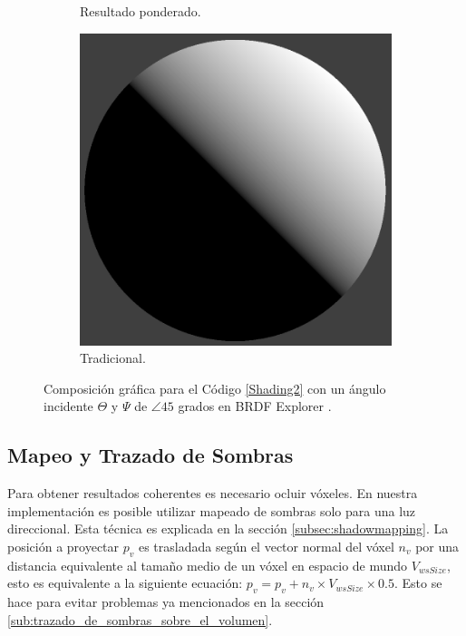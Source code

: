 \begin{figure}[H]
\begin{subfigure}[t]{0.2\textwidth}
		\caption*{Resultado ponderado.}
	\end{subfigure}%
	\begin{subfigure}[t]{0.2\textwidth}
		\centering
		\captionsetup{justification=centering}
		\includegraphics[width=\linewidth]{media/nDotLT.png}
		\caption*{Tradicional.}
	\end{subfigure}%
	\caption{Composición gráfica para el Código \ref{Shading2} con un ángulo incidente $\Theta$ y $\Psi$ de $\angle 45$ grados en BRDF Explorer \cite{brdf_explorer}.}
	\label{fig:compositve_vshading}
\end{figure}

\subsection{Mapeo y Trazado de Sombras}

Para obtener resultados coherentes es necesario ocluir vóxeles. En nuestra implementación es posible utilizar mapeado de sombras solo para una luz direccional. Esta técnica es explicada en la sección \ref{subsec:shadowmapping}. La posición a proyectar $p_{v}$ es trasladada según el vector normal del vóxel $n_{v}$ por una distancia equivalente al tamaño medio de un vóxel en espacio de mundo $V_{wsSize}$, esto es equivalente a la siguiente ecuación: $p_{v} = p_{v} + n_{v}\times V_{wsSize}\times 0.5$. Esto se hace para evitar problemas ya mencionados en la sección \ref{sub:trazado_de_sombras_sobre_el_volumen}.

